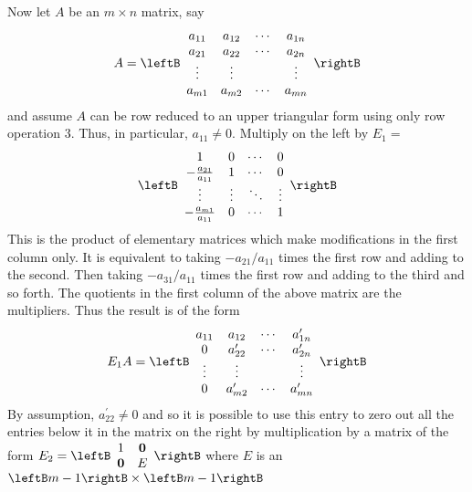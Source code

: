 Now let $A$ be an $m\times n$ matrix, say 
\begin{equation*}
A=\leftB 
\begin{array}{cccc}
a_{11} & a_{12} & \cdots & a_{1n} \\ 
a_{21} & a_{22} & \cdots & a_{2n} \\ 
\vdots & \vdots &  & \vdots \\ 
a_{m1} & a_{m2} & \cdots & a_{mn}
\end{array}
\rightB
\end{equation*}
and assume $A$ can be row reduced to an upper triangular form using only row
operation 3. Thus, in particular, $a_{11}\neq 0$. Multiply on the left by $
E_{1}=$
\begin{equation*}
\leftB 
\begin{array}{cccc}
1 & 0 & \cdots & 0 \\ 
-
\frac{a_{21}}{a_{11}} & 1 & \cdots & 0 \\ 
\vdots & \vdots & \ddots & \vdots \\ 
-\frac{a_{m1}}{a_{11}} & 0 & \cdots & 1
\end{array}
\rightB
\end{equation*}
This is the product of elementary matrices which make modifications in the
first column only. It is equivalent to taking $-a_{21}/a_{11}$ times the
first row and adding to the second. Then taking $-a_{31}/a_{11}$ times the
first row and adding to the third and so forth. The quotients in the first
column of the above matrix are the multipliers. Thus the result is of the
form 
\begin{equation*}
E_{1}A=\leftB 
\begin{array}{cccc}
a_{11} & a_{12} & \cdots & a_{1n}^{\prime } \\ 
0 & a_{22}^{\prime } & \cdots & a_{2n}^{\prime } \\ 
\vdots & \vdots &  & \vdots \\ 
0 & a_{m2}^{\prime } & \cdots & a_{mn}^{\prime }%
\end{array}
\rightB
\end{equation*}
By assumption, $a_{22}^{\prime }\neq 0$ and so it is possible to use this
entry to zero out all the entries below it in the matrix on the right by
multiplication by a matrix of the form $E_{2}=\leftB 
\begin{array}{cc}
1 & \mathbf{0} \\ 
\mathbf{0} & E
\end{array}
\rightB $ where $E$ is an $\leftB m-1\rightB \times \leftB m-1\rightB $
